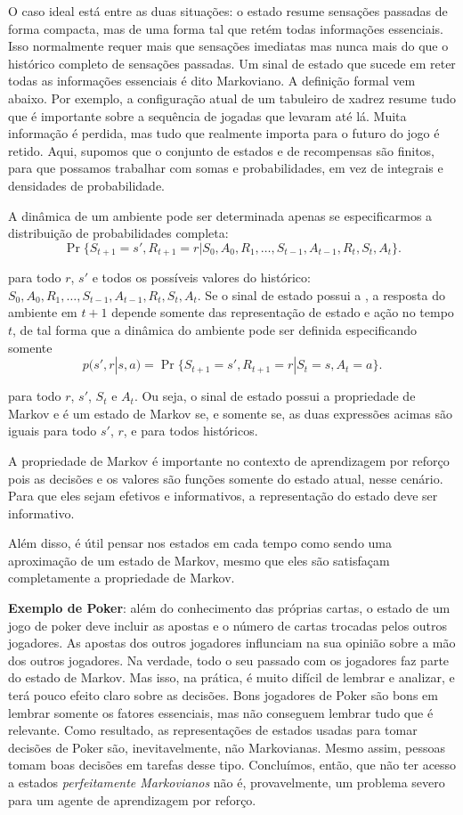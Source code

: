 \documentclass{article}
\begin{document}
O caso ideal está entre as duas situações: o estado resume sensações passadas de forma compacta, mas de uma forma tal que retém todas informações essenciais. Isso normalmente requer mais que sensações imediatas mas nunca mais do que o histórico completo de sensações passadas. Um sinal de estado que sucede em reter todas as informações essenciais é dito Markoviano. A definição formal vem abaixo. Por exemplo, a configuração atual de um tabuleiro de xadrez resume tudo que é importante sobre a sequência de jogadas que levaram até lá. Muita informação é perdida, mas tudo que realmente importa para o futuro do jogo é retido. Aqui, supomos que o conjunto de estados e de recompensas são finitos, para que possamos trabalhar com somas e probabilidades, em vez de integrais e densidades de probabilidade.

A dinâmica de um ambiente pode ser determinada apenas se especificarmos a distribuição de probabilidades completa: \[
  \Pr\{S_{t+1} = s', R_{t+1} = r | S_0,A_0,R_1,\ldots,S_{t-1},A_{t-1},R_t,S_t,A_t\}
.\] 

para todo $r$, $s'$ e todos os possíveis valores do histórico: $S_0,A_0,R_1,\ldots,S_{t-1},A_{t-1},R_t,S_t,A_t$. Se o sinal de estado possui a , a resposta do ambiente em $t+1$ depende somente das representação de estado e ação no tempo $t$, de tal forma que a dinâmica do ambiente pode ser definida especificando somente \[
  p(s',r|s,a)=\Pr\{S_{t+1}=s',R_{t+1}=r|S_t=s,A_t=a\}
.\] 

para todo $r$, $s'$, $S_t$ e $A_t$. Ou seja, o sinal de estado possui a propriedade de Markov e é um estado de Markov se, e somente se, as duas expressões acimas são iguais para todo $s'$, $r$, e para todos históricos.

A propriedade de Markov é importante no contexto de aprendizagem por reforço pois as decisões e os valores são funções somente do estado atual, nesse cenário. Para que eles sejam efetivos e informativos, a representação do estado deve ser informativo. 

Além disso, é útil pensar nos estados em cada tempo como sendo uma aproximação de um estado de Markov, mesmo que eles são satisfaçam completamente a propriedade de Markov.

\textbf{Exemplo de Poker}: além do conhecimento das próprias cartas, o estado de um jogo de poker deve incluir as apostas e o número de cartas trocadas pelos outros jogadores. As apostas dos outros jogadores influnciam na sua opinião sobre a mão dos outros jogadores. Na verdade, todo o seu passado com os jogadores faz parte do estado de Markov. 
Mas isso, na prática, é muito difícil de lembrar e analizar, e terá pouco efeito claro sobre as decisões. Bons jogadores de Poker são bons em lembrar somente os fatores essenciais, mas não conseguem lembrar tudo que é relevante. Como resultado, as representações de estados usadas para tomar decisões de Poker são, inevitavelmente, não Markovianas. Mesmo assim, pessoas tomam boas decisões em tarefas desse tipo. Concluímos, então, que não ter acesso a estados \textit{perfeitamente Markovianos} não é, provavelmente, um problema severo para um agente de aprendizagem por reforço.
\end{document}

